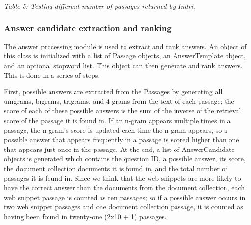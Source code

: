 \documentclass[11pt]{article}
\begin{document}
\begin{table}
\begin{center}

\vspace{1mm}
\emph{Table 5: Testing different number of passages returned by Indri.}
\end{center}
\end{table}

\subsubsection{Answer candidate extraction and ranking}

The answer processing module is used to extract and rank answers.  An object of this class is initialized with a list of Passage objects, an AnswerTemplate object, and an optional stopword list.  This object can then generate and rank answers.  This is done in a series of steps.

First, possible answers are extracted from the Passages by generating all unigrams, bigrams, trigrams, and 4-grams from the text of each passage; the score of each of these possible answers is the sum of the inverse of the retrieval score of the passage it is found in.  If an n-gram appears multiple times in a passage, the n-gram's score is updated each time the n-gram appears, so a possible answer that appears frequently in a passage is scored higher than one that appears just once in the passage. At the end, a list of AnswerCandidate objects is generated which contains the question ID, a possible answer, its score, the document collection documents it is found in, and the total number of passages it is found in.  Since we think that the web snippets are more likely to have the correct answer than the documents from the document collection, each web snippet passage is counted as ten passages; so if a possible answer occurs in two web snippet passages and one document collection passage, it is counted as having been found in twenty-one (2x10 + 1) passages.
\end{document}
